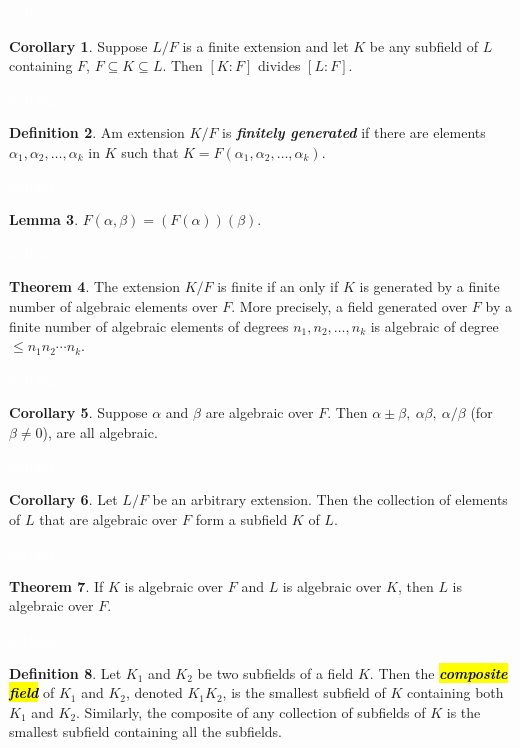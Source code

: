 \documentclass{article}
\theoremstyle{definition}
\newtheorem{thm}{Theorem}[section]
\newtheorem{lem}[thm]{Lemma}
\newtheorem{cor}[thm]{Corollary}
\newtheorem{defn}[thm]{Definition}
\newcommand{\nl}{\textcolor{white}{nothing}}
\newcommand{\seq}{\subseteq}
\newcommand{\al}{\alpha}
\newcommand{\be}{\beta}
\begin{document}
\nl

\begin{cor}
Suppose $L/F$ is a finite extension and let $K$ be any subfield of $L$ containing $F$, $F\seq K\seq L$. Then $[K:F]$ divides $[L:F]$.
\end{cor}

\nl

\begin{defn}
Am extension $K/F$ is \textbf{\textit{finitely generated}} if there are elements $\al_1,\al_2,\ldots,\al_k$ in $K$ such that $K = F(\al_1,\al_2,\ldots,\al_k)$.
\end{defn}

\nl

\begin{lem}
$F(\al,\be)= (F(\al))(\be)$.
\end{lem}

\nl

\begin{thm}
The extension $K/F$ is finite if an only if $K$ is generated by a finite number of algebraic elements over $F$. More precisely, a field generated over $F$ by a finite number of algebraic elements of degrees $n_1,n_2,\ldots, n_k$ is algebraic of degree $\leq n_1n_2\cdots n_k$.
\end{thm}

\nl

\begin{cor}
Suppose $\al$ and $\be$ are algebraic over $F$. Then $\al\pm\be,\ \al\be,\ \al/\be$ (for $\be\neq 0$), are all algebraic.
\end{cor}

\nl

\begin{cor}
Let $L/F$ be an arbitrary extension. Then the collection of elements of $L$ that are algebraic over $F$ form a subfield $K$ of $L$.
\end{cor}

\nl

\begin{thm}
If $K$ is algebraic over $F$ and $L$ is algebraic over $K$, then $L$ is algebraic over $F$.
\end{thm}

\nl

\begin{defn}
Let $K_1$ and $K_2$ be two subfields of a field $K$. Then the \hl{\textit{\textbf{composite field}}} of $K_1$ and $K_2$, denoted $K_1K_2$, is the smallest subfield of $K$ containing both $K_1$ and $K_2$. Similarly, the composite of any collection of subfields of $K$ is the smallest subfield containing all the subfields.
\end{defn}
\end{document}
